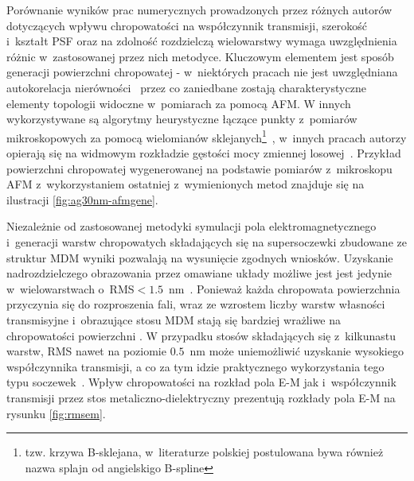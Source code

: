 Porównanie wyników prac numerycznych prowadzonych przez różnych autorów dotyczących wpływu chropowatości na współczynnik transmisji, szerokość i~kształt PSF oraz na zdolność rozdzielczą wielowarstwy wymaga uwzględnienia różnic w~zastosowanej przez nich metodyce. Kluczowym elementem jest sposób generacji powierzchni chropowatej - w~niektórych pracach nie jest uwzględniana autokorelacja nierówności~\cite{guo2014negative} przez co zaniedbane zostają charakterystyczne elementy topologii widoczne w~pomiarach za pomocą AFM. W innych wykorzystywane są algorytmy heurystyczne łączące punkty z~pomiarów mikroskopowych za pomocą wielomianów sklejanych\footnote{tzw. krzywa B-sklejana, w~literaturze polskiej postulowana bywa również nazwa splajn od angielskigo B-spline}~\cite{ludwig2012impact}, w~innych pracach autorzy opierają się na widmowym rozkładzie gęstości mocy zmiennej losowej~\cite{pastuszczak2013engineering}. Przykład powierzchni chropowatej wygenerowanej na podstawie pomiarów z~mikroskopu AFM z~wykorzystaniem ostatniej z~wymienionych metod znajduje się na ilustracji \ref{fig:ag30nm-afmgene}.

Niezależnie od zastosowanej metodyki symulacji pola elektromagnetycznego i~generacji warstw chropowatych składających się na supersoczewki zbudowane ze struktur MDM wyniki pozwalają na wysunięcie zgodnych wniosków. Uzyskanie nadrozdzielczego obrazowania przez omawiane układy  możliwe jest jest jedynie w~wielowarstwach o~RMS$<1.5$~nm~\citep{guo2014negative,stefaniuk2011effect,ludwig2012impact}. Ponieważ każda chropowata powierzchnia przyczynia się do rozproszenia fali, wraz ze wzrostem liczby warstw własności transmisyjne i~obrazujące stosu MDM stają się bardziej wrażliwe na chropowatości powierzchni \cite{guo2014negative}. W przypadku stosów składających się z~kilkunastu warstw, RMS nawet na poziomie $0.5$~nm może uniemożliwić uzyskanie wysokiego współczynnika transmisji, a co za tym idzie praktycznego wykorzystania tego typu soczewek~\cite{pastuszczak2013engineering}. Wpływ chropowatości na rozkład pola E-M jak i~współczynnik transmisji przez stos metaliczno-dielektryczny prezentują rozkłady pola E-M na rysunku \ref{fig:rmsem}.








